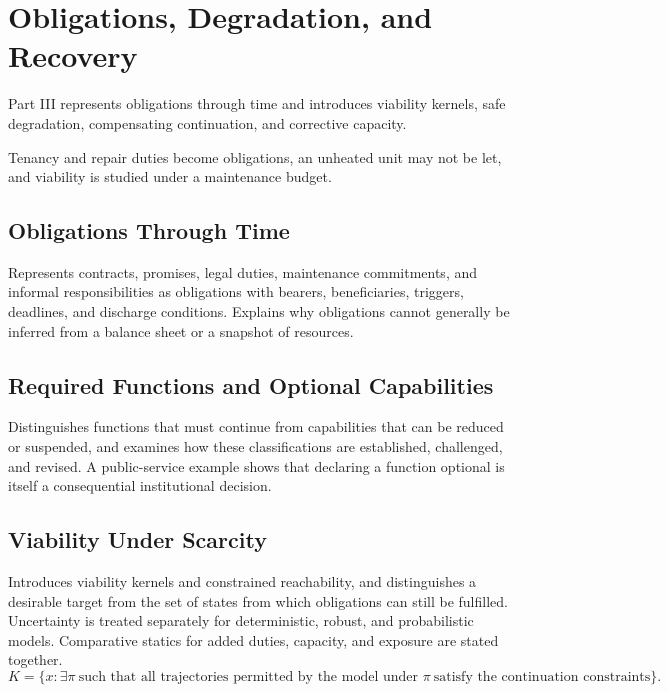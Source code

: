 \part{Obligations, Degradation, and Recovery}
\label{part:III}

Part III represents obligations through time and introduces viability kernels, safe degradation, compensating continuation, and corrective capacity.

\begin{housing}Tenancy and repair duties become obligations, an unheated unit may not be let, and viability is studied under a maintenance budget.\end{housing}

\chapter{Obligations Through Time}\label{ch:11}
Represents contracts, promises, legal duties, maintenance commitments, and informal responsibilities as obligations with bearers, beneficiaries, triggers, deadlines, and discharge conditions. Explains why obligations cannot generally be inferred from a balance sheet or a snapshot of resources.
\scaffold

\chapter{Required Functions and Optional Capabilities}\label{ch:12}
Distinguishes functions that must continue from capabilities that can be reduced or suspended, and examines how these classifications are established, challenged, and revised. A public-service example shows that declaring a function optional is itself a consequential institutional decision.
\scaffold

\chapter{Viability Under Scarcity}\label{ch:13}
Introduces viability kernels and constrained reachability, and distinguishes a desirable target from the set of states from which obligations can still be fulfilled. Uncertainty is treated separately for deterministic, robust, and probabilistic models. Comparative statics for added duties, capacity, and exposure are stated together.
\[
K=\bigl\{x:\exists\pi\ \text{such that all trajectories permitted by the model under }\pi\ \text{satisfy the continuation constraints}\bigr\}.
\]
\scaffold

